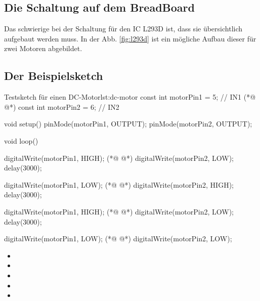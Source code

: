 \clearpage
\subsection{Die Schaltung auf dem BreadBoard}
Das schwierige bei der Schaltung für den IC L293D ist, dass sie übersichtlich aufgebaut 
werden muss. In der Abb. \ref{fig:l293d} ist ein mögliche Aufbau dieser für zwei Motoren 
abgebildet. 



\subsection{Der Beispielsketch}
\begin{multicols}{2}
\begin{arduinoCode}{Testsketch für einen DC-Motor}{lst:dc-motor}
  const int motorPin1 = 5;  // IN1 (*@ @*)
  const int motorPin2 = 6;  // IN2
    
  void setup() {
    pinMode(motorPin1, OUTPUT); 
    pinMode(motorPin2, OUTPUT); 
  }

  void loop() {
    digitalWrite(motorPin1, HIGH); (*@ @*)
    digitalWrite(motorPin2, LOW);  
    delay(3000);
    
    digitalWrite(motorPin1, LOW);  (*@ @*)
    digitalWrite(motorPin2, HIGH);
    delay(3000);
    
    digitalWrite(motorPin1, HIGH);  (*@ @*)
    digitalWrite(motorPin2, LOW);  
    delay(3000);
    
    digitalWrite(motorPin1, LOW);  (*@ @*)
    digitalWrite(motorPin2, LOW);
   }
\end{arduinoCode}

\columnbreak
\vfill\null 
\begin{itemize}
  \itemsep20pt
    \item[] 
    \item[] 
    \item[] 
    \item[] 
    \item[] 
 \end{itemize}
\vfill \null

\end{multicols}

